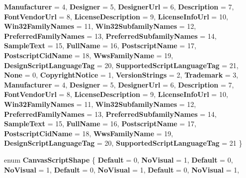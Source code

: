 \begin{DoxyCompactItemize}
{\bfseries Manufacturer} = 4, 
{\bfseries Designer} = 5, 
\newline
{\bfseries Designer\+Url} = 6, 
{\bfseries Description} = 7, 
{\bfseries Font\+Vendor\+Url} = 8, 
{\bfseries License\+Description} = 9, 
\newline
{\bfseries License\+Info\+Url} = 10, 
{\bfseries Win32\+Family\+Names} = 11, 
{\bfseries Win32\+Subfamily\+Names} = 12, 
{\bfseries Preferred\+Family\+Names} = 13, 
\newline
{\bfseries Preferred\+Subfamily\+Names} = 14, 
{\bfseries Sample\+Text} = 15, 
{\bfseries Full\+Name} = 16, 
{\bfseries Postscript\+Name} = 17, 
\newline
{\bfseries Postscript\+Cid\+Name} = 18, 
{\bfseries Wws\+Family\+Name} = 19, 
{\bfseries Design\+Script\+Language\+Tag} = 20, 
{\bfseries Supported\+Script\+Language\+Tag} = 21, 
\newline
{\bfseries None} = 0, 
{\bfseries Copyright\+Notice} = 1, 
{\bfseries Version\+Strings} = 2, 
{\bfseries Trademark} = 3, 
\newline
{\bfseries Manufacturer} = 4, 
{\bfseries Designer} = 5, 
{\bfseries Designer\+Url} = 6, 
{\bfseries Description} = 7, 
\newline
{\bfseries Font\+Vendor\+Url} = 8, 
{\bfseries License\+Description} = 9, 
{\bfseries License\+Info\+Url} = 10, 
{\bfseries Win32\+Family\+Names} = 11, 
\newline
{\bfseries Win32\+Subfamily\+Names} = 12, 
{\bfseries Preferred\+Family\+Names} = 13, 
{\bfseries Preferred\+Subfamily\+Names} = 14, 
{\bfseries Sample\+Text} = 15, 
\newline
{\bfseries Full\+Name} = 16, 
{\bfseries Postscript\+Name} = 17, 
{\bfseries Postscript\+Cid\+Name} = 18, 
{\bfseries Wws\+Family\+Name} = 19, 
\newline
{\bfseries Design\+Script\+Language\+Tag} = 20, 
{\bfseries Supported\+Script\+Language\+Tag} = 21
 \}
\item 
\mbox{\label{namespace_microsoft_1_1_graphics_1_1_canvas_1_1_text_a384b9463c1092502564c5ab676b2de09}} 
enum {\bfseries Canvas\+Script\+Shape} \{ \newline
{\bfseries Default} = 0, 
{\bfseries No\+Visual} = 1, 
{\bfseries Default} = 0, 
{\bfseries No\+Visual} = 1, 
\newline
{\bfseries Default} = 0, 
{\bfseries No\+Visual} = 1, 
{\bfseries Default} = 0, 
{\bfseries No\+Visual} = 1, 
\newline

\end{DoxyCompactItemize}
